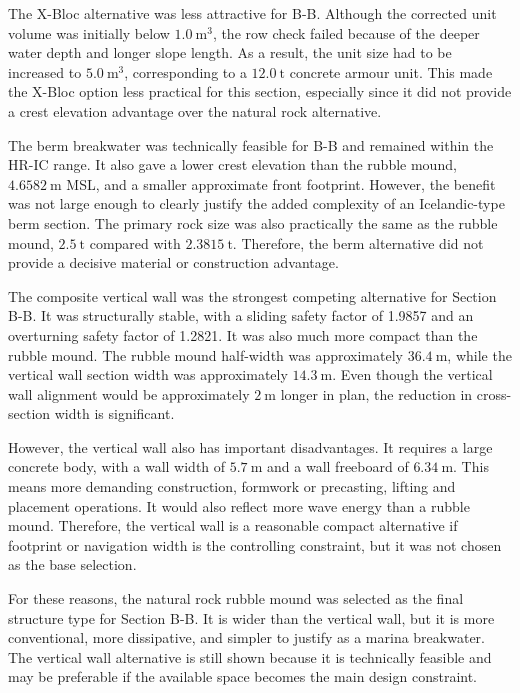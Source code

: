 \documentclass[a4paper, 11pt]{article}
\begin{document}
The X-Bloc alternative was less attractive for B-B. Although the corrected unit volume was initially below \(1.0~\mathrm{m^3}\), the row check failed because of the deeper water depth and longer slope length. As a result, the unit size had to be increased to \(5.0~\mathrm{m^3}\), corresponding to a \(12.0~\mathrm{t}\) concrete armour unit. This made the X-Bloc option less practical for this section, especially since it did not provide a crest elevation advantage over the natural rock alternative.

The berm breakwater was technically feasible for B-B and remained within the HR-IC range. It also gave a lower crest elevation than the rubble mound, \(4.6582~\mathrm{m}\) MSL, and a smaller approximate front footprint. However, the benefit was not large enough to clearly justify the added complexity of an Icelandic-type berm section. The primary rock size was also practically the same as the rubble mound, \(2.5~\mathrm{t}\) compared with \(2.3815~\mathrm{t}\). Therefore, the berm alternative did not provide a decisive material or construction advantage.

The composite vertical wall was the strongest competing alternative for Section B-B. It was structurally stable, with a sliding safety factor of 1.9857 and an overturning safety factor of 1.2821. It was also much more compact than the rubble mound. The rubble mound half-width was approximately \(36.4~\mathrm{m}\), while the vertical wall section width was approximately \(14.3~\mathrm{m}\). Even though the vertical wall alignment would be approximately \(2~\mathrm{m}\) longer in plan, the reduction in cross-section width is significant.

However, the vertical wall also has important disadvantages. It requires a large concrete body, with a wall width of \(5.7~\mathrm{m}\) and a wall freeboard of \(6.34~\mathrm{m}\). This means more demanding construction, formwork or precasting, lifting and placement operations. It would also reflect more wave energy than a rubble mound. Therefore, the vertical wall is a reasonable compact alternative if footprint or navigation width is the controlling constraint, but it was not chosen as the base selection.

For these reasons, the natural rock rubble mound was selected as the final structure type for Section B-B. It is wider than the vertical wall, but it is more conventional, more dissipative, and simpler to justify as a marina breakwater. The vertical wall alternative is still shown because it is technically feasible and may be preferable if the available space becomes the main design constraint.
\end{document}
